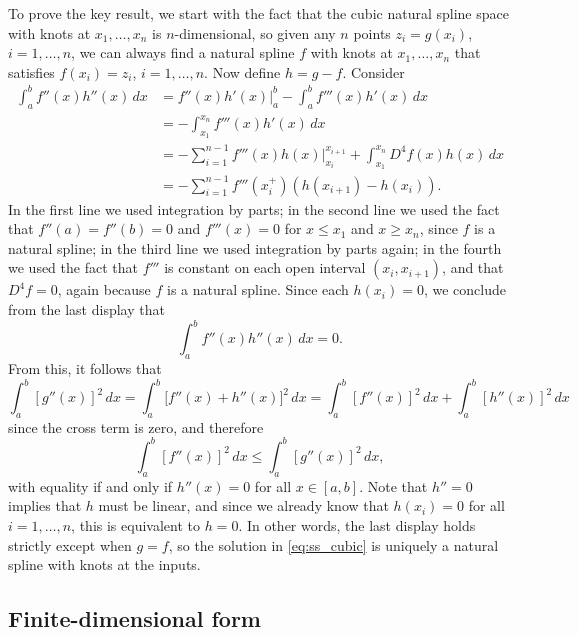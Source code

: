 \documentclass{article}
\begin{document}
To prove
the key result, we start with the fact that the cubic natural spline space with
knots at $x_1,\dots,x_n$ is $n$-dimensional, so given any $n$ points $z_i =
g(x_i)$, $i=1,\dots,n$, we can always find a natural spline $f$ with knots at
$x_1,\dots,x_n$ that satisfies $f(x_i) = z_i$, $i=1,\dots,n$. Now define $h =
g-f$. Consider 
\begin{align*}
\int_a^b f''(x) h''(x) \, dx 
&= f''(x) h'(x) \Big|_a^b - \int_a^b f'''(x) h'(x) \, dx \\
&= -\int_{x_1}^{x_n} f'''(x) h'(x) \, dx \\ 
&= -\sum_{i=1}^{n-1} f'''(x) h(x) \Big|_{x_i}^{x_{i+1}} +  
\int_{x_1}^{x_n} D^4 f(x) h(x) \, dx \\
&= -\sum_{i=1}^{n-1} f'''(x_i^+) (h(x_{i+1}) - h(x_i)).
\end{align*}
In the first line we used integration by parts; in the second line we used the
fact that $f''(a) = f''(b) = 0$ and $f'''(x)=0$ for $x \leq x_1$ and $x \geq
x_n$, since $f$ is a natural spline; in the third line we used integration by
parts again; in the fourth we used the fact that $f'''$ is constant on each open
interval $(x_i,x_{i+1})$, and that $D^4 f=0$, again because $f$ is a natural
spline. Since each $h(x_i)=0$, we conclude from the last display that
\[
\int_a^b f''(x) h''(x) \, dx = 0.
\]
From this, it follows that
\[
\int_a^b [g''(x)]^2 \, dx 
= \int_a^b \big[ f''(x) + h''(x) \big]^2 \, dx 
= \int_a^b [f''(x)]^2 \, dx + \int_a^b [h''(x)]^2 \, dx
\]
since the cross term is zero, and therefore 
\[
\int_a^b [f''(x)]^2 \, dx \leq \int_a^b [g''(x)]^2 \, dx,
\]
with equality if and only if $h''(x)=0$ for all $x \in [a,b]$. Note that $h''=0$
implies that $h$ must be linear, and since we already know that $h(x_i)=0$ for
all $i=1,\dots,n$, this is equivalent to $h=0$. In other words, the last display
holds strictly except when $g=f$, so the solution in \eqref{eq:ss_cubic} is
uniquely a natural spline with knots at the inputs. 

\subsection{Finite-dimensional form}
\end{document}
